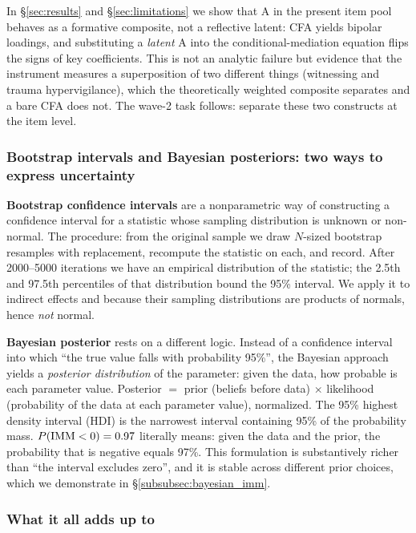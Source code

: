 In §\ref{sec:results} and §\ref{sec:limitations} we show that A in the present item pool behaves as a formative composite, not a reflective latent: CFA yields bipolar loadings, and substituting a \emph{latent} A into the conditional-mediation equation flips the signs of key coefficients. This is not an analytic failure but evidence that the instrument measures a superposition of two different things (witnessing and trauma hypervigilance), which the theoretically weighted composite separates and a bare CFA does not. The wave-2 task follows: separate these two constructs at the item level.

\subsubsection{Bootstrap intervals and Bayesian posteriors: two ways to express uncertainty}

\textbf{Bootstrap confidence intervals} are a nonparametric way of constructing a confidence interval for a statistic whose sampling distribution is unknown or non-normal. The procedure: from the original sample we draw $N$-sized bootstrap resamples with replacement, recompute the statistic on each, and record. After 2000--5000 iterations we have an empirical distribution of the statistic; the 2.5th and 97.5th percentiles of that distribution bound the 95\% interval. We apply it to indirect effects and \IMM{} because their sampling distributions are products of normals, hence \emph{not} normal.

\textbf{Bayesian posterior} rests on a different logic. Instead of a confidence interval into which ``the true value falls with probability 95\%'', the Bayesian approach yields a \emph{posterior distribution} of the parameter: given the data, how probable is each parameter value. Posterior $=$ prior (beliefs before data) $\times$ likelihood (probability of the data at each parameter value), normalized. The 95\% highest density interval (HDI) is the narrowest interval containing 95\% of the probability mass. $P(\mathrm{IMM} < 0) = 0.97$ literally means: given the data and the prior, the probability that \IMM{} is negative equals 97\%. This formulation is substantively richer than ``the interval excludes zero'', and it is stable across different prior choices, which we demonstrate in §\ref{subsubsec:bayesian_imm}.

\subsubsection{What it all adds up to}

